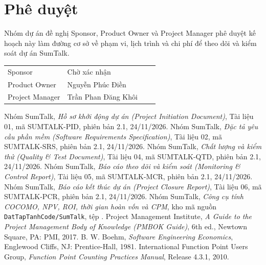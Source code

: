 \documentclass[12pt,a4paper]{report}
\begin{document}
\section{Phê duyệt}

Nhóm dự án đề nghị Sponsor, Product Owner và Project Manager phê duyệt kế hoạch này làm đường cơ sở về phạm vi,
lịch trình và chi phí để theo dõi và kiểm soát dự án SumTalk.

\begin{table}[H]
  \centering
  \renewcommand{\arraystretch}{2.4}
  \begin{tabularx}{\linewidth}{@{}P{3.6cm}LP{3.2cm}P{2.6cm}@{}}
    \toprule
     &  &  &  \\
    \midrule
    Sponsor & Chờ xác nhận & & \\
    Product Owner & Nguyễn Phúc Điền & & \\
    Project Manager & Trần Phan Đăng Khôi & & \\
    \bottomrule
  \end{tabularx}
\end{table}

\begin{thebibliography}{9}
   Nhóm SumTalk, \emph{Hồ sơ khởi động dự án (Project Initiation Document)}, Tài liệu 01,
    mã SUMTALK-PID, phiên bản 2.1, 24/11/2026.
   Nhóm SumTalk, \emph{Đặc tả yêu cầu phần mềm (Software Requirements Specification)},
    Tài liệu 02, mã SUMTALK-SRS, phiên bản 2.1, 24/11/2026.
   Nhóm SumTalk, \emph{Chất lượng và kiểm thử (Quality \& Test Document)}, Tài liệu 04,
    mã SUMTALK-QTD, phiên bản 2.1, 24/11/2026.
   Nhóm SumTalk, \emph{Báo cáo theo dõi và kiểm soát (Monitoring \& Control Report)}, Tài liệu 05,
    mã SUMTALK-MCR, phiên bản 2.1, 24/11/2026.
   Nhóm SumTalk, \emph{Báo cáo kết thúc dự án (Project Closure Report)}, Tài liệu 06,
    mã SUMTALK-PCR, phiên bản 2.1, 24/11/2026.
   Nhóm SumTalk, \emph{Công cụ tính COCOMO, NPV, ROI, thời gian hoàn vốn và CPM},
    kho mã nguồn \texttt{DatTapTanhCode/SumTalk}, tệp .
   Project Management Institute, \emph{A Guide to the Project Management Body of Knowledge
    (PMBOK Guide)}, 6th ed., Newtown Square, PA: PMI, 2017.
   B. W. Boehm, \emph{Software Engineering Economics}, Englewood Cliffs, NJ: Prentice-Hall, 1981.
   International Function Point Users Group, \emph{Function Point Counting Practices Manual},
    Release 4.3.1, 2010.
\end{thebibliography}
\end{document}
